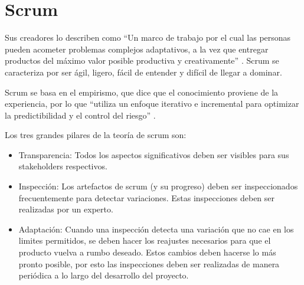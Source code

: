 \section{Scrum}

Sus creadores lo describen como “Un marco de trabajo por el cual las personas pueden acometer problemas complejos 
adaptativos, a la vez que entregar productos del máximo valor posible productiva y creativamente” \cite{scrum_guide}. Scrum se caracteriza por ser ágil, ligero, fácil de entender y difícil de llegar a dominar.

Scrum se basa en el empirismo, que dice que el conocimiento proviene de la experiencia, por lo que ``utiliza un enfoque iterativo e incremental para optimizar la predictibilidad y el control del riesgo'' \cite{scrum_guide}.

Los tres grandes pilares de la teoría de scrum son:

\begin{itemize}
  \item Transparencia: Todos los aspectos significativos deben ser visibles para sus stakeholders respectivos.

  \item Inspección: Los artefactos de scrum (y su progreso) deben ser inspeccionados frecuentemente para detectar variaciones. Estas inspecciones deben ser realizadas por un experto.

  \item Adaptación: Cuando una inspección detecta una variación que no cae en los limites permitidos, se deben hacer los reajustes necesarios para que el producto vuelva a rumbo deseado. Estos cambios deben hacerse lo más pronto posible, por esto las inspecciones deben ser realizadas de manera periódica a lo largo del desarrollo del proyecto.
\end{itemize}
